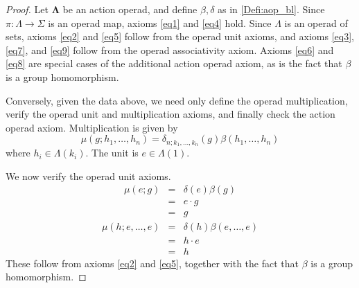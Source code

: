\documentclass{amsbook} %
\newcommand{\mb}{\mathbf}
\numberwithin{section}{chapter}
\begin{document}
\begin{proof}
Let $\mb{\Lambda}$ be an action operad, and define $\beta, \delta$ as in \cref{Defi:aop_bl}.  Since $\pi:\Lambda \rightarrow \Sigma$ is an operad map, axioms \eqref{eq1} and \eqref{eq4} hold.  Since $\Lambda$ is an operad of sets, axioms \eqref{eq2} and \eqref{eq5} follow from the operad unit axioms, and axioms \eqref{eq3}, \eqref{eq7}, and \eqref{eq9} follow from the operad associativity axiom.  Axioms \eqref{eq6} and \eqref{eq8} are special cases of the additional action operad axiom, as is the fact that $\beta$ is a group homomorphism.

Conversely, given the data above, we need only define the operad multiplication, verify the operad unit and multiplication axioms,  and finally check the action operad axiom.  Multiplication is given by
\[
\mu(g; h_{1}, \ldots, h_{n}) = \delta_{n; k_{1}, \ldots, k_{n}}(g) \beta(h_{1}, \ldots, h_{n})
\]
where $h_{i} \in \Lambda(k_{i})$.  The unit is $e \in \Lambda(1)$.

We now verify the operad unit axioms.
\[
\begin{array}{rcl}
\mu(e; g) & = & \delta(e)\beta(g) \\
& = & e \cdot g \\
& = & g
\end{array}
\]
\[
\begin{array}{rcl}
\mu(h; e, \ldots, e) & = & \delta(h)\beta(e, \ldots, e) \\
& = & h \cdot e \\
& = & h
\end{array}
\]
These follow from axioms \eqref{eq2} and \eqref{eq5}, together with the fact that $\beta$ is a group homomorphism.


\end{proof}
\end{document}
